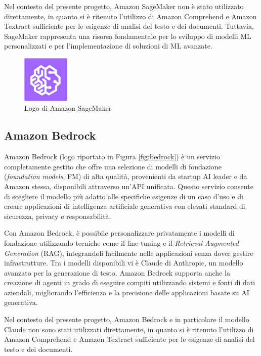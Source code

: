 Nel contesto del presente progetto, Amazon SageMaker non è stato utilizzato direttamente, in quanto si è ritenuto l'utilizzo di Amazon Comprehend e Amazon Textract sufficiente per le esigenze di analisi del testo e dei documenti. Tuttavia, SageMaker rappresenta una risorsa fondamentale per lo sviluppo di modelli ML personalizzati e per l'implementazione di soluzioni di ML avanzate.
\begin{figure}[h]
  \centering
  \includegraphics[width=0.2\textwidth]{img/tecnologie/sagemaker.png}
  \caption{Logo di Amazon SageMaker}
  \label{fig:sagemaker}
\end{figure}

\subsection{Amazon Bedrock}
Amazon Bedrock (logo riportato in Figura \ref{fig:bedrock}) è un servizio completamente gestito che offre una selezione di modelli di fondazione (\textit{foundation models}, FM) di alta qualità, provenienti da startup AI leader e da Amazon stessa, disponibili attraverso un'API unificata. Questo servizio consente di scegliere il modello più adatto alle specifiche esigenze di un caso d'uso e di creare applicazioni di intelligenza artificiale generativa con elevati standard di sicurezza, privacy e responsabilità. 

Con Amazon Bedrock, è possibile personalizzare privatamente i modelli di fondazione utilizzando tecniche come il fine-tuning e il \textit{Retrieval Augmented Generation} (RAG), integrandoli facilmente nelle applicazioni senza dover gestire infrastrutture. Tra i modelli disponibili vi è Claude di Anthropic, un modello avanzato per la generazione di testo. Amazon Bedrock supporta anche la creazione di agenti in grado di eseguire compiti utilizzando sistemi e fonti di dati aziendali, migliorando l'efficienza e la precisione delle applicazioni basate su AI generativa.

Nel contesto del presente progetto, Amazon Bedrock e in particolare il modello Claude non sono stati utilizzati direttamente, in quanto si è ritenuto l'utilizzo di Amazon Comprehend e Amazon Textract sufficiente per le esigenze di analisi del testo e dei documenti.

